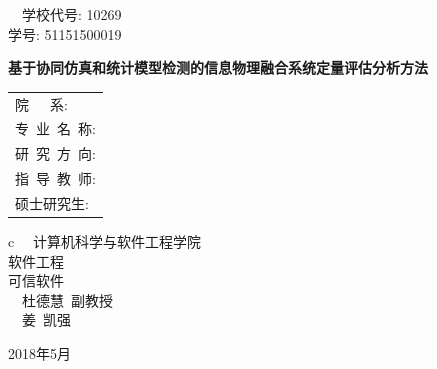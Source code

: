 \pagestyle{empty}

\hskip 4.75cm {{ ~~学校代号: {\large 10269}}}\\
\hspace*{\fill} {{ 学号: {\large 51151500019}}}

\vskip 2cm

\begin{center}
\end{center}

\vskip 3cm

\begin{center}
{\bf 基于协同仿真和统计模型检测的信息物理融合系统定量评估分析方法}
\end{center}

\vskip 3cm {\Large
\begin{center}
\begin{tabular}{l}
院\qquad\ \ \ 系:\\
专~业~名~称:\\
研~究~方~向:\\
指~导~教~师:\\
硕士研究生:
\end{tabular}
\begin{tabular}c
~~计算机科学与软件工程学院 \\
\hline  软件工程 \\
\hline  可信软件  \\
\hline ~~杜德慧\  副教授  \\
\hline ~~姜\ 凯强\   \\
\hline
\end{tabular}
\end{center}}

\vskip 30mm

\begin{center}
{\Large 2018年5月}
\end{center}
